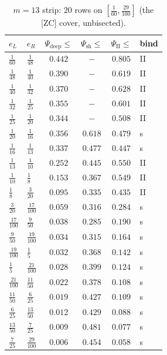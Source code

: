 \begin{table}[p]\centering\small
\caption{$m=13$ strip: $20$ rows on $[\tfrac1{60},\tfrac{29}{100}]$ (the [ZC] cover, unbisected).}\label{zc9:tab:m13}
\begin{tabular}{llcccl}\toprule
$e_L$&$e_R$&$\Psi_{\mathrm{deep}}\!\le$&$\Psi_{\mathrm{sh}}\!\le$&$\Psi_{\mathrm{II}}\!\le$&bind\\\midrule
$\tfrac{1}{60}$&$\tfrac{1}{48}$&$0.442$&$-$&$0.805$&II\\
$\tfrac{1}{48}$&$\tfrac{1}{40}$&$0.390$&$-$&$0.619$&II\\
$\tfrac{1}{40}$&$\tfrac{1}{32}$&$0.370$&$-$&$0.628$&II\\
$\tfrac{1}{32}$&$\tfrac{1}{25}$&$0.355$&$-$&$0.601$&II\\
$\tfrac{1}{25}$&$\tfrac{1}{20}$&$0.344$&$-$&$0.508$&II\\
$\tfrac{1}{20}$&$\tfrac{1}{16}$&$0.356$&$0.618$&$0.479$&s\\
$\tfrac{1}{16}$&$\tfrac{1}{13}$&$0.337$&$0.477$&$0.447$&s\\
$\tfrac{1}{13}$&$\tfrac{1}{10}$&$0.252$&$0.445$&$0.550$&II\\
$\tfrac{1}{10}$&$\tfrac{1}{8}$&$0.153$&$0.367$&$0.549$&II\\
$\tfrac{1}{8}$&$\tfrac{3}{20}$&$0.095$&$0.335$&$0.435$&II\\
$\tfrac{3}{20}$&$\tfrac{17}{100}$&$0.059$&$0.316$&$0.284$&s\\
$\tfrac{17}{100}$&$\tfrac{9}{50}$&$0.038$&$0.285$&$0.190$&s\\
$\tfrac{9}{50}$&$\tfrac{19}{100}$&$0.034$&$0.315$&$0.164$&s\\
$\tfrac{19}{100}$&$\tfrac{1}{5}$&$0.032$&$0.368$&$0.142$&s\\
$\tfrac{1}{5}$&$\tfrac{21}{100}$&$0.028$&$0.399$&$0.124$&s\\
$\tfrac{21}{100}$&$\tfrac{11}{50}$&$0.022$&$0.378$&$0.108$&s\\
$\tfrac{11}{50}$&$\tfrac{6}{25}$&$0.019$&$0.427$&$0.109$&s\\
$\tfrac{6}{25}$&$\tfrac{13}{50}$&$0.012$&$0.429$&$0.088$&s\\
$\tfrac{13}{50}$&$\tfrac{7}{25}$&$0.009$&$0.481$&$0.077$&s\\
$\tfrac{7}{25}$&$\tfrac{29}{100}$&$0.006$&$0.454$&$0.058$&s\\
\bottomrule\end{tabular}\end{table}
